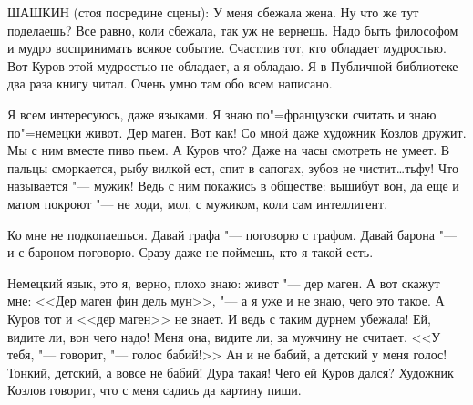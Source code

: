 
ШАШКИН  (стоя посредине сцены):  У  меня
сбежала жена. Ну что же  тут поделаешь?  Все
равно, коли сбежала, так уж не вернешь. Надо
быть философом и мудро  воспринимать  всякое
событие. Счастлив тот,  кто обладает  мудростью. 
Вот Куров этой мудростью  не обладает,
а  я  обладаю.  Я в Публичной библиотеке два
раза  книгу читал. Очень  умно там обо  всем
написано.
    
Я всем интересуюсь, даже языками. Я знаю
по"=французски считать и знаю по"=немецки  живот. Дер маген. Вот как! 
Со мной даже художник  Козлов  дружит.  Мы  с  ним вместе пиво
пьем. А Куров что? Даже на часы  смотреть не
умеет. В пальцы сморкается, рыбу вилкой ест,
спит в сапогах, зубов не чистит\dots тьфу! Что
называется "--- мужик!  Ведь с ним  покажись  в
обществе: вышибут вон, да еще и матом покроют  "---  не ходи, мол, с мужиком, коли сам интеллигент.
    
Ко  мне не подкопаешься.  Давай графа  "---
поговорю с графом. Давай барона  "--- и с бароном 
поговорю. Сразу даже не поймешь,  кто  я
такой есть.
    
Немецкий язык, это я, верно, плохо знаю:
живот "--- дер маген.  А вот  скажут мне:  <<Дер
маген фин дель мун>>,  "---  а  я уже и не знаю,
чего это такое. А Куров тот и <<дер маген>> не
знает.  И ведь с таким дурнем  убежала!  Ей,
видите ли, вон чего надо!  Меня она,  видите
ли, за мужчину не считает. <<У тебя, "---  говорит, "--- голос бабий!>> 
Ан и не бабий,  а  детский у меня голос!  Тонкий, детский, а вовсе
не бабий!  Дура такая!  Чего ей Куров дался?
Художник  Козлов говорит,  что с меня садись
да картину пиши.
